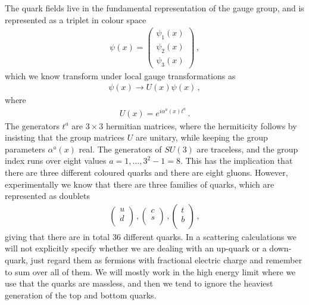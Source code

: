 The quark fields live in the fundamental representation of the gauge group, and is represented as a triplet in colour space
\begin{align}
    \psi(x)= \begin{pmatrix}
           \psi_{1}(x) \\
           \psi_{2}(x) \\
           \psi_{3}(x)
         \end{pmatrix}\,,
\end{align}
which we know transform under local gauge transformations as
\begin{align}
    \psi(x)\rightarrow U(x)\psi(x)\,,
\end{align}
where
\begin{align}
    U(x)=e^{i\alpha^{a}(x)t^{a}}\,.
\end{align}
The generators $t^{a}$ are $3\times 3$ hermitian matrices, where the hermiticity follows by insisting that the group matrices $U$ are unitary, while keeping the group parameters $\alpha^{a}(x)$ real. The generators of $SU(3)$ are traceless, and the group index runs over eight values $a=1,\dots,3^{2}-1=8$. This has the implication that there are three different coloured quarks and there are eight gluons. However, experimentally we know that there are three families of quarks, which are represented as doublets
\begin{align}
    \begin{pmatrix}
           u \\
           d \\
         \end{pmatrix}\,,
         \begin{pmatrix}
           c \\
           s \\
         \end{pmatrix}\,,
         \begin{pmatrix}
           t \\
           b \\
         \end{pmatrix}\,,
\end{align}
giving that there are in total 36 different quarks. In a scattering calculations we will not explicitly specify whether we are dealing with an up-quark or a down-quark, just regard them as fermions with fractional electric charge and remember to sum over all of them. We will mostly work in the high energy limit where we use that the quarks are massless, and then we tend to ignore the heaviest generation of the top and bottom quarks. 

